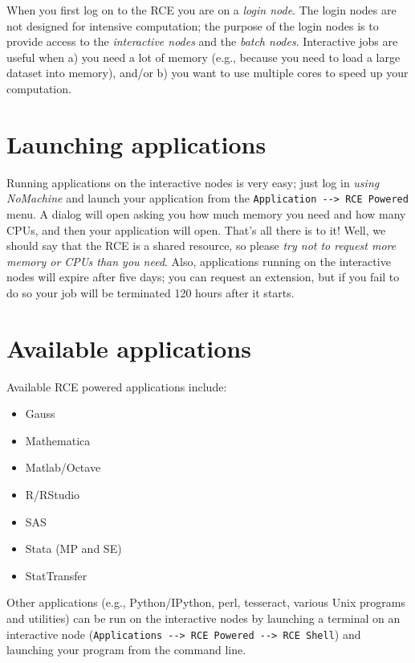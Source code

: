 \documentclass[
]{book}
\providecommand{\tightlist}{%
  \setlength{\itemsep}{0pt}\setlength{\parskip}{0pt}}
\begin{document}
When you first log on to the RCE you are on a \emph{login node}. The login
nodes are not designed for intensive computation; the purpose of the
login nodes is to provide access to the \emph{interactive nodes} and the
\emph{batch nodes}. Interactive jobs are useful when a) you need a lot of
memory (e.g., because you need to load a large dataset into memory),
and/or b) you want to use multiple cores to speed up your computation.

\hypertarget{launching-applications}{%
\section{Launching applications}\label{launching-applications}}

Running applications on the interactive nodes is very easy; just log in
\emph{using NoMachine} and launch your application from the
\texttt{Application\ -\/-\textgreater{}\ RCE\ Powered} menu. A dialog will open asking you how
much memory you need and how many CPUs, and then your application will
open. That's all there is to it! Well, we should say that the RCE is a
shared resource, so please \emph{try not to request more memory or CPUs than
you need}. Also, applications running on the interactive nodes will
expire after five days; you can request an extension, but if you fail to
do so your job will be terminated 120 hours after it starts.

\hypertarget{available-applications}{%
\section{Available applications}\label{available-applications}}

Available RCE powered applications include:

\begin{itemize}
\tightlist
\item
  Gauss
\item
  Mathematica
\item
  Matlab/Octave
\item
  R/RStudio
\item
  SAS
\item
  Stata (MP and SE)
\item
  StatTransfer
\end{itemize}

Other applications (e.g., Python/IPython, perl, tesseract, various Unix
programs and utilities) can be run on the interactive nodes by launching
a terminal on an interactive node
(\texttt{Applications\ -\/-\textgreater{}\ RCE\ Powered\ -\/-\textgreater{}\ RCE\ Shell}) and launching your
program from the command line.
\end{document}
